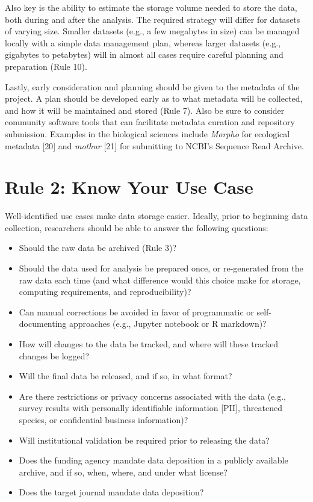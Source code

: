 \documentclass[10pt,letterpaper]{article}
\providecommand{\tightlist}{%
  \setlength{\itemsep}{0pt}\setlength{\parskip}{0pt}
}
\begin{document}
Also key is the ability to estimate the storage volume needed to store
the data, both during and after the analysis. The required strategy will
differ for datasets of varying size. Smaller datasets (e.g., a few
megabytes in size) can be managed locally with a simple data management
plan, whereas larger datasets (e.g., gigabytes to petabytes) will in
almost all cases require careful planning and preparation (Rule 10).

Lastly, early consideration and planning should be given to the metadata
of the project. A plan should be developed early as to what metadata
will be collected, and how it will be maintained and stored (Rule 7).
Also be sure to consider community software tools that can facilitate
metadata curation and repository submission. Examples in the biological
sciences include \emph{Morpho} for ecological metadata {[}20{]} and
\emph{mothur} {[}21{]} for submitting to NCBI's Sequence Read Archive.

\section*{Rule 2: Know Your Use Case}\label{rule-2-know-your-use-case}

Well-identified use cases make data storage easier. Ideally, prior to
beginning data collection, researchers should be able to answer the
following questions:

\begin{itemize}
\tightlist
\item
  Should the raw data be archived (Rule 3)?
\item
  Should the data used for analysis be prepared once, or re-generated
  from the raw data each time (and what difference would this choice
  make for storage, computing requirements, and reproducibility)?
\item
  Can manual corrections be avoided in favor of programmatic or
  self-documenting approaches (e.g., Jupyter notebook or R markdown)?
\item
  How will changes to the data be tracked, and where will these tracked
  changes be logged?
\item
  Will the final data be released, and if so, in what format?
\item
  Are there restrictions or privacy concerns associated with the data
  (e.g., survey results with personally identifiable information
  {[}PII{]}, threatened species, or confidential business information)?
\item
  Will institutional validation be required prior to releasing the data?
\item
  Does the funding agency mandate data deposition in a publicly
  available archive, and if so, when, where, and under what license?
\item
  Does the target journal mandate data deposition?
\end{itemize}
\end{document}
